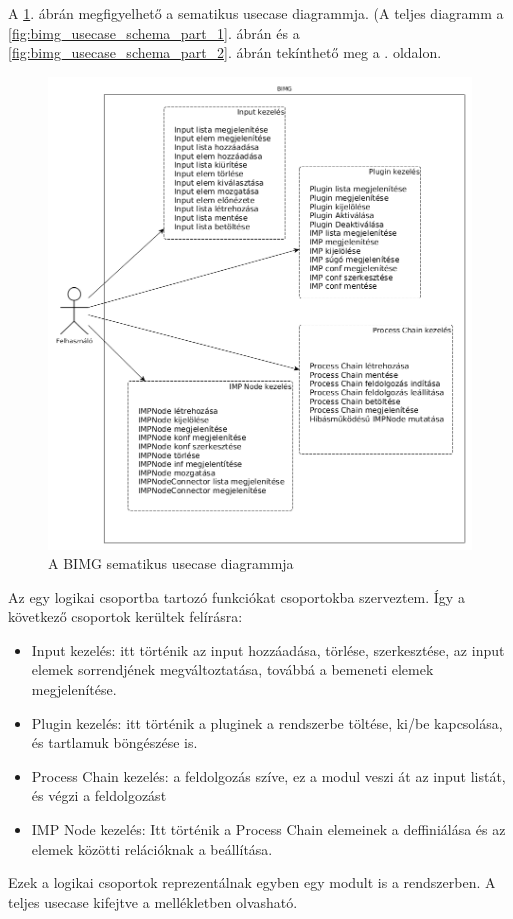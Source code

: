 \documentclass[a4paper,12pt,oneside]{report}
\begin{document}
A \ref{fig:bimg_usecase_schema}. ábrán megfigyelhető a sematikus usecase diagrammja. (A teljes diagramm a \ref{fig:bimg_usecase_schema_part_1}. ábrán és a \ref{fig:bimg_usecase_schema_part_2}. ábrán tekínthető meg a \pageref{fig:bimg_usecase_schema_part_1}. oldalon.
\begin{figure}[h]
  \includegraphics[width=\textwidth]{schematic_usecase.png}
  \caption{A BIMG sematikus usecase diagrammja}
  \label{fig:bimg_usecase_schema}
\end{figure}

Az egy logikai csoportba tartozó funkciókat csoportokba szerveztem. Így a következő csoportok kerültek felírásra:
\begin{itemize}
	\itemsep0em
	\item Input kezelés: itt történik az input hozzáadása, törlése, szerkesztése, az input elemek sorrendjének megváltoztatása, továbbá a bemeneti elemek megjelenítése.
	\item Plugin kezelés: itt történik a pluginek a rendszerbe töltése, ki/be kapcsolása, és tartlamuk böngészése is.
	\item Process Chain kezelés: a feldolgozás szíve, ez a modul veszi át az input listát, és végzi a feldolgozást
	\item IMP Node kezelés: Itt történik a Process Chain elemeinek a deffiniálása és az elemek közötti relációknak a beállítása.
\end{itemize}
Ezek a logikai csoportok reprezentálnak egyben egy modult is a rendszerben.
A teljes usecase kifejtve a mellékletben olvasható.
\end{document}
